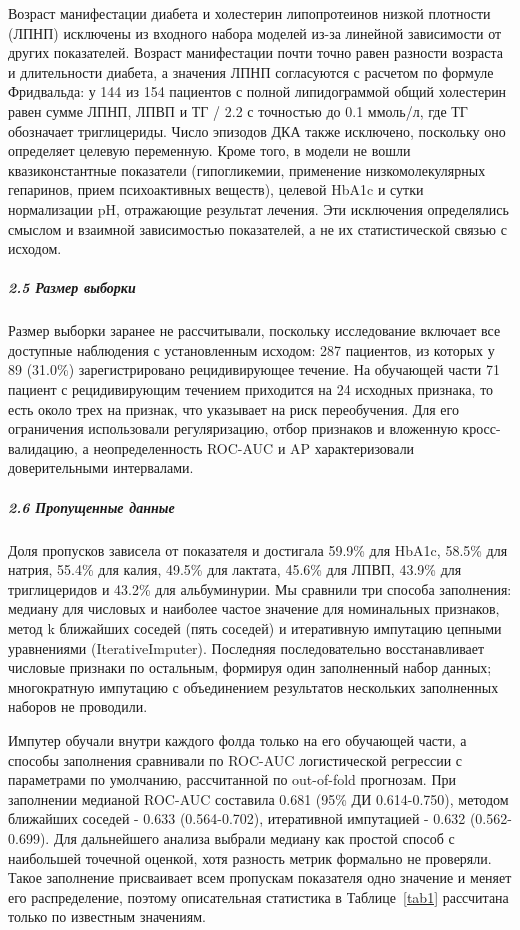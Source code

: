 \documentclass{crm-article}
\begin{document}
Возраст манифестации диабета и холестерин липопротеинов низкой плотности (ЛПНП) исключены из входного набора моделей из-за линейной зависимости от других показателей. Возраст манифестации почти точно равен разности возраста и длительности диабета, а значения ЛПНП согласуются с расчетом по формуле Фридвальда: у 144 из 154 пациентов с полной липидограммой общий холестерин равен сумме ЛПНП, ЛПВП и ТГ / 2.2 с точностью до 0.1 ммоль/л, где ТГ обозначает триглицериды. Число эпизодов ДКА также исключено, поскольку оно определяет целевую переменную. Кроме того, в модели не вошли квазиконстантные показатели (гипогликемии, применение низкомолекулярных гепаринов, прием психоактивных веществ), целевой HbA1c и сутки нормализации pH, отражающие результат лечения. Эти исключения определялись смыслом и взаимной зависимостью показателей, а не их статистической связью с исходом.

\subparagraph{2.5 Размер выборки}\label{subsec2_5}

Размер выборки заранее не рассчитывали, поскольку исследование включает все доступные наблюдения с установленным исходом: 287 пациентов, из которых у 89 (31.0\%) зарегистрировано рецидивирующее течение. На обучающей части 71 пациент с рецидивирующим течением приходится на 24 исходных признака, то есть около трех на признак, что указывает на риск переобучения. Для его ограничения использовали регуляризацию, отбор признаков и вложенную кросс-валидацию, а неопределенность ROC-AUC и AP характеризовали доверительными интервалами.

\subparagraph{2.6 Пропущенные данные}\label{subsec2_6}

Доля пропусков зависела от показателя и достигала 59.9\% для HbA1c, 58.5\% для натрия, 55.4\% для калия, 49.5\% для лактата, 45.6\% для ЛПВП, 43.9\% для триглицеридов и 43.2\% для альбуминурии. Мы сравнили три способа заполнения: медиану для числовых и наиболее частое значение для номинальных признаков, метод k ближайших соседей (пять соседей) и итеративную импутацию цепными уравнениями (IterativeImputer). Последняя последовательно восстанавливает числовые признаки по остальным, формируя один заполненный набор данных; многократную импутацию с объединением результатов нескольких заполненных наборов не проводили.

Импутер обучали внутри каждого фолда только на его обучающей части, а способы заполнения сравнивали по ROC-AUC логистической регрессии с параметрами по умолчанию, рассчитанной по out-of-fold прогнозам. При заполнении медианой ROC-AUC составила 0.681 (95\% ДИ 0.614-0.750), методом ближайших соседей - 0.633 (0.564-0.702), итеративной импутацией - 0.632 (0.562-0.699). Для дальнейшего анализа выбрали медиану как простой способ с наибольшей точечной оценкой, хотя разность метрик формально не проверяли. Такое заполнение присваивает всем пропускам показателя одно значение и меняет его распределение, поэтому описательная статистика в Таблице~\ref{tab1} рассчитана только по известным значениям.
\end{document}
